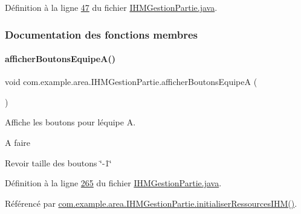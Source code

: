 Définition à la ligne \hyperlink{_i_h_m_gestion_partie_8java_source_l00047}{47} du fichier \hyperlink{_i_h_m_gestion_partie_8java_source}{I\+H\+M\+Gestion\+Partie.\+java}.



\subsubsection{Documentation des fonctions membres}
\mbox{\label{classcom_1_1example_1_1area_1_1_i_h_m_gestion_partie_a6c63ebbc9822ef53f43468d100ab5677}} 
\paragraph{\texorpdfstring{afficher\+Boutons\+Equipe\+A()}{afficherBoutonsEquipeA()}}
{\footnotesize\ttfamily void com.\+example.\+area.\+I\+H\+M\+Gestion\+Partie.\+afficher\+Boutons\+EquipeA (\begin{DoxyParamCaption}{ }\end{DoxyParamCaption})\hspace{0.3cm}{\ttfamily [private]}}



Affiche les boutons pour l\textquotesingle{}équipe A. 

\begin{DoxyRefDesc}{A faire}
\item[\hyperlink{todo__todo000001}{A faire}]Revoir taille des boutons \char`\"{}-\/1\char`\"{} \end{DoxyRefDesc}


Définition à la ligne \hyperlink{_i_h_m_gestion_partie_8java_source_l00265}{265} du fichier \hyperlink{_i_h_m_gestion_partie_8java_source}{I\+H\+M\+Gestion\+Partie.\+java}.



Référencé par \hyperlink{_i_h_m_gestion_partie_8java_source_l00223}{com.\+example.\+area.\+I\+H\+M\+Gestion\+Partie.\+initialiser\+Ressources\+I\+H\+M()}.


